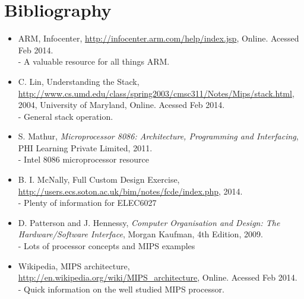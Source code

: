 \documentclass[12pt,a4paper]{article}
\begin{document}



\makeatletter 
	\renewcommand\@biblabel[1]{\textbullet}
\makeatother

\section*{Bibliography}

\begin{itemize}
   \item{
      ARM, 
      Infocenter,
      \url{http://infocenter.arm.com/help/index.jsp},
      Online. Acessed Feb 2014.\\
      - A valuable resource for all things ARM.
   }
   \item{
      C. Lin,
      Understanding the Stack,
      \url{http://www.cs.umd.edu/class/spring2003/cmsc311/Notes/Mips/stack.html},
      2004,
      University of Maryland,
      Online. Acessed Feb 2014.\\
      - General stack operation.

   }
   \item{
      S. Mathur,
      \emph{Microprocessor 8086: Architecture, Programming and Interfacing},
      PHI Learning Private Limited,
      2011.\\
      - Intel 8086 microprocessor resource
   }
   \item{
      B. I. McNally,
      Full Custom Design Exercise,
      \url{http://users.ecs.soton.ac.uk/bim/notes/fcde/index.php},
      2014.\\
      - Plenty of information for ELEC6027
   }
   \item{
      D. Patterson and J. Hennessy,
      \emph{Computer Organisation and Design: The Hardware/Software Interface},
      Morgan Kaufman,
      4th Edition,
      2009.\\
      - Lots of processor concepts and MIPS examples
   }
   \item{
      Wikipedia,
      MIPS architecture,
      \url{http://en.wikipedia.org/wiki/MIPS_architecture},
      Online. Acessed Feb 2014.\\
      - Quick information on the well studied MIPS processor.
   }
\end{itemize}

%
%
%
%
%
%
\end{document}
